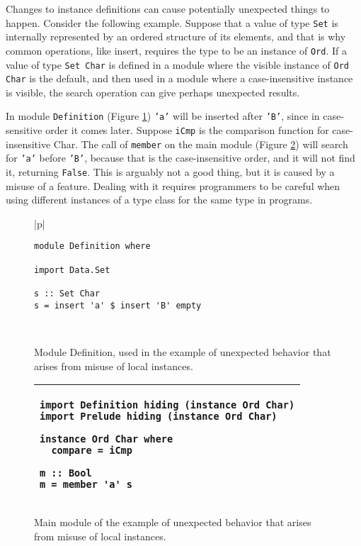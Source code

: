 \documentclass[msc]{ppgccufmg}
\begin{document}
Changes to instance definitions can cause potentially unexpected
things to happen. Consider the following example. Suppose that a value
of type \texttt{Set} is internally represented by an ordered structure
of its elements, and that is why common operations, like insert,
requires the type to be an instance of \texttt{Ord}.  If a value of
type \texttt{Set Char} is defined in a module where the visible
instance of \texttt{Ord Char} is the default, and then used in a
module where a case-insensitive instance is visible, the search
operation can give perhaps unexpected results.

In module \texttt{Definition} (Figure \ref{definition}) \texttt{'a'}
will be inserted after \texttt{'B'}, since in case-sensitive order it
comes later.  Suppose \texttt{iCmp} is the comparison function
for case-insensitive Char.  The call of \texttt{member} on the main module
(Figure
\ref{main-set}) will search for \texttt{'a'} before \texttt{'B'},
because that is the case-insensitive order, and it will not find it,
returning \texttt{False}.  This is arguably not a good thing, but it is caused
by a misuse of a
feature. Dealing with it requires programmers to be careful when using
different instances of a type class for the same type in programs.

\begin{figure}
\caption{Module Definition, used in the example of unexpected behavior that
  arises from misuse of local instances.\label{definition}}
\begin{tabular}{|p{\textwidth}|}
\hline
\begin{verbatim}
module Definition where

import Data.Set

s :: Set Char
s = insert 'a' $ insert 'B' empty
\end{verbatim}
\\
\hline
\end{tabular}
\end{figure}

\begin{figure}
\caption{Main module of the example of unexpected behavior that arises from
  misuse of local instances.\label{main-set}}
\begin{tabular}{|p{\textwidth}|}
\hline
\begin{verbatim}
import Definition hiding (instance Ord Char)
import Prelude hiding (instance Ord Char)

instance Ord Char where
  compare = iCmp

m :: Bool
m = member 'a' s
\end{verbatim}
\vspace{-0.7cm}\\
\hline
\end{tabular}
\end{figure}
\end{document}
